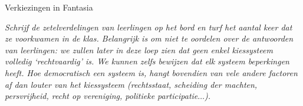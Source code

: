 \begin{lesactiviteit}{Verkiezingen in Fantasia}
\begin{vraagenantwoord}
\end{vraagenantwoord}

\textit{Schrijf de zetelverdelingen van leerlingen op het bord en turf het aantal keer dat ze voorkwamen in de klas. Belangrijk is om niet te oordelen over de antwoorden van leerlingen: we zullen later in deze loep zien dat geen enkel kiessysteem volledig `rechtvaardig' is. We kunnen zelfs bewijzen dat elk systeem beperkingen heeft. Hoe democratisch een systeem is, hangt bovendien van vele andere factoren af dan louter van het kiessysteem (rechtsstaat, scheiding der machten, persvrijheid, recht op vereniging, politieke participatie$\ldots$).}
\end{lesactiviteit}
